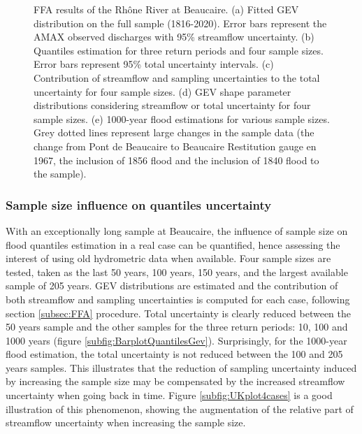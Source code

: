 \documentclass[11pt]{article}
\begin{document}
\begin{figure}[p]
            
        \caption{FFA results of the Rhône River at Beaucaire. (a) Fitted GEV distribution on the full sample (1816-2020). Error bars represent the AMAX observed discharges with 95\% streamflow uncertainty.
        (b) Quantiles estimation for three return periods and four sample sizes. Error bars represent 95\% total uncertainty intervals.
        (c) Contribution of streamflow and sampling uncertainties to the total uncertainty for four sample sizes. 
        (d) GEV shape parameter distributions considering streamflow or total uncertainty for four sample sizes. 
        (e) 1000-year flood estimations for various sample sizes. Grey dotted lines represent large changes in the sample data (the change from Pont de Beaucaire to Beaucaire Restitution gauge en 1967, the inclusion of 1856 flood and the inclusion of 1840 flood to the sample).}
        \label{fig:Quantiles}
        \end{figure}

        \subsubsection{Sample size influence on quantiles uncertainty}
        
        With an exceptionally long sample at Beaucaire, the influence of sample size on flood quantiles estimation in a real case can be quantified, hence assessing the interest of using old hydrometric data when available. Four sample sizes are tested, taken as the last 50 years, 100 years, 150 years, and the largest available sample of 205 years. GEV distributions are estimated and the contribution of both streamflow and sampling uncertainties is computed for each case, following section \ref{subsec:FFA} procedure. Total uncertainty is clearly reduced between the 50 years sample and the other samples for the three return periods: 10, 100 and 1000 years (figure \ref{subfig:BarplotQuantilesGev}). Surprisingly, for the 1000-year flood estimation, the total uncertainty is not reduced between the 100 and 205 years samples. This illustrates that the reduction of sampling uncertainty induced by increasing the sample size may be compensated by the increased streamflow uncertainty when going back in time. Figure \ref{subfig:UKplot4cases} is a good illustration of this phenomenon, showing the augmentation of the relative part of streamflow uncertainty when increasing the sample size.
        
\end{document}

